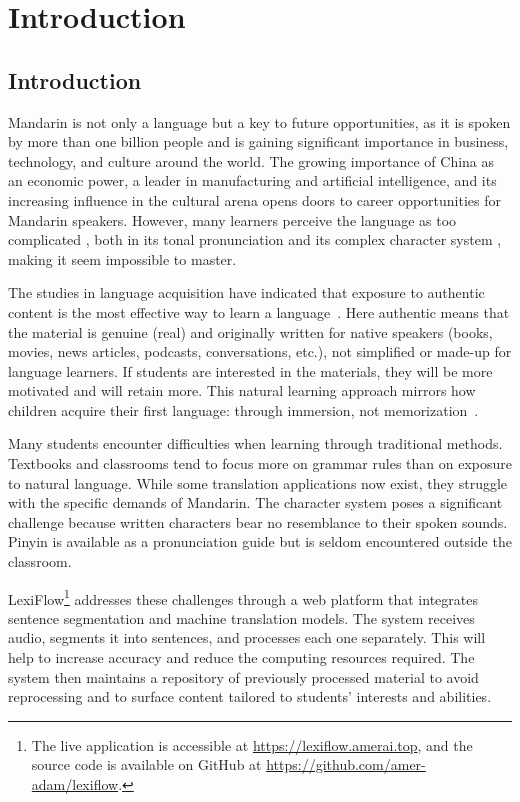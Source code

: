 \documentclass[oneside]{utmthesis}
\begin{document}

\mainmatter
\chapter{Introduction}
\section{Introduction}
Mandarin is not only a language but a key to future opportunities, as it is spoken by more than one billion people and is gaining significant importance in business, technology, and culture around the world. The growing importance of China as an economic power, a leader in manufacturing and artificial intelligence, and its increasing influence in the cultural arena opens doors to career opportunities for Mandarin speakers. However, many learners perceive the language as too complicated , both in its tonal pronunciation and its complex character system , making it seem impossible to master.

The studies in language acquisition have indicated that exposure to authentic content is the most effective way to learn a language~\citep{krashen1985,Mayer_2009}. Here authentic means that the material is genuine (real) and originally written for native speakers (books, movies, news articles, podcasts, conversations, etc.), not simplified or made-up for language learners. If students are interested in the materials, they will be more motivated and will retain more. This natural learning approach mirrors how children acquire their first language: through immersion, not memorization~\citep{cychosz2021, gowenlock2024}.

Many students encounter difficulties when learning through traditional methods. Textbooks and classrooms tend to focus more on grammar rules than on exposure to natural language. While some translation applications now exist, they struggle with the specific demands of Mandarin. The character system poses a significant challenge because written characters bear no resemblance to their spoken sounds. Pinyin is available as a pronunciation guide but is seldom encountered outside the classroom.

LexiFlow\footnote{The live application is accessible at \url{https://lexiflow.amerai.top}, and the source code is available on GitHub at \url{https://github.com/amer-adam/lexiflow}.} addresses these challenges through a web platform that integrates sentence segmentation and machine translation models. The system receives audio, segments it into sentences, and processes each one separately. This will help to increase accuracy and reduce the computing resources required. The system then maintains a repository of previously processed material to avoid reprocessing and to surface content tailored to students' interests and abilities.
\end{document}
